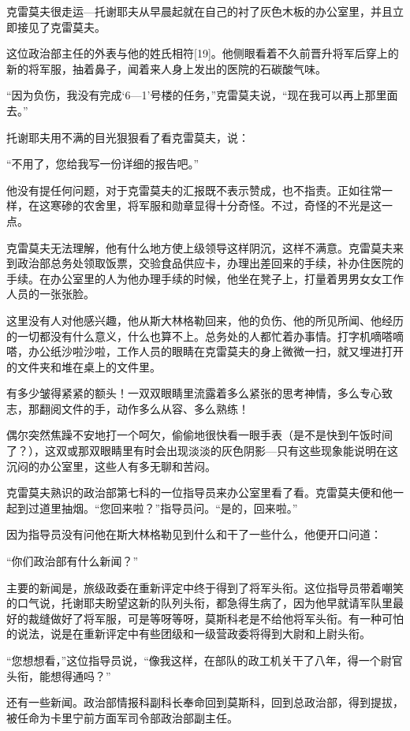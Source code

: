 克雷莫夫很走运—托谢耶夫从早晨起就在自己的衬了灰色木板的办公室里，并且立即接见了克雷莫夫。

这位政治部主任的外表与他的姓氏相符[19]。他侧眼看着不久前晋升将军后穿上的新的将军服，抽着鼻子，闻着来人身上发出的医院的石碳酸气味。

“因为负伤，我没有完成‘6—1’号楼的任务，”克雷莫夫说，“现在我可以再上那里面去。”

托谢耶夫用不满的目光狠狠看了看克雷莫夫，说：

“不用了，您给我写一份详细的报告吧。”

他没有提任何问题，对于克雷莫夫的汇报既不表示赞成，也不指责。正如往常一样，在这寒碜的农舍里，将军服和勋章显得十分奇怪。不过，奇怪的不光是这一点。

克雷莫夫无法理解，他有什么地方使上级领导这样阴沉，这样不满意。克雷莫夫来到政治部总务处领取饭票，交验食品供应卡，办理出差回来的手续，补办住医院的手续。在办公室里的人为他办理手续的时候，他坐在凳子上，打量着男男女女工作人员的一张张脸。

这里没有人对他感兴趣，他从斯大林格勒回来，他的负伤、他的所见所闻、他经历的一切都没有什么意义，什么也算不上。总务处的人都忙着办事情。打字机嘀嗒嘀嗒，办公纸沙啦沙啦，工作人员的眼睛在克雷莫夫的身上微微一扫，就又埋进打开的文件夹和堆在桌上的文件里。

有多少皱得紧紧的额头！一双双眼睛里流露着多么紧张的思考神情，多么专心致志，那翻阅文件的手，动作多么从容、多么熟练！

偶尔突然焦躁不安地打一个呵欠，偷偷地很快看一眼手表（是不是快到午饭时间了？），这双或那双眼睛里有时会出现淡淡的灰色阴影—只有这些现象能说明在这沉闷的办公室里，这些人有多无聊和苦闷。

克雷莫夫熟识的政治部第七科的一位指导员来办公室里看了看。克雷莫夫便和他一起到过道里抽烟。“您回来啦？”指导员问。“是的，回来啦。”

因为指导员没有问他在斯大林格勒见到什么和干了一些什么，他便开口问道：

“你们政治部有什么新闻？”

主要的新闻是，旅级政委在重新评定中终于得到了将军头衔。这位指导员带着嘲笑的口气说，托谢耶夫盼望这新的队列头衔，都急得生病了，因为他早就请军队里最好的裁缝做好了将军服，可是等呀等呀，莫斯科老是不给他将军头衔。有一种可怕的说法，说是在重新评定中有些团级和一级营政委将得到大尉和上尉头衔。

“您想想看，”这位指导员说，“像我这样，在部队的政工机关干了八年，得一个尉官头衔，能想得通吗？”

还有一些新闻。政治部情报科副科长奉命回到莫斯科，回到总政治部，得到提拔，被任命为卡里宁前方面军司令部政治部副主任。


